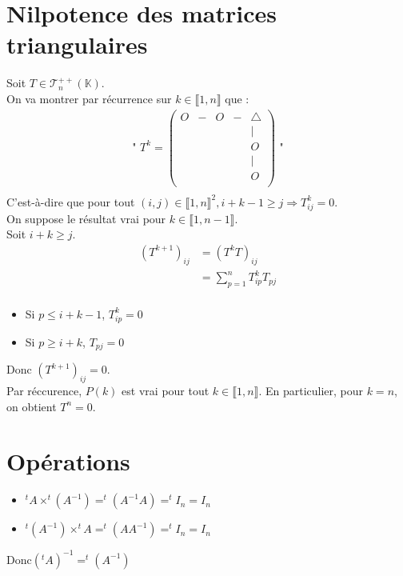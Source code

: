 \documentclass[../main.tex]{subfiles}
\begin{document}
\section{Nilpotence des matrices triangulaires}
Soit $T \in \mathcal{T}_n^{++}(\mathbb{K})$. \\
On va montrer par récurrence sur $k \in \llbracket 1, n \rrbracket$ que :
\begin{align*}
    \text{" } T^k = 
    \begin{pmatrix}
        O & - & O & - & \triangle \\
        & & & & | \\
        & & & & O \\
        & & & & | \\
        & & & & O \\
    \end{pmatrix}
    \text{ "} \\
\end{align*}
C'est-à-dire que pour tout $(i,j) \in \llbracket 1, n \rrbracket^2, i + k - 1 \geq j \Rightarrow T_{ij}^k = 0$. \\
On suppose le résultat vrai pour $k \in \llbracket 1, n-1 \rrbracket$. \\
Soit $i + k \geq j$. 
\begin{align*}
    (T^{k+1})_{ij} &= (T^k T)_{ij} \\
    &= \sum^n_{p=1} T^k_{ip}T_{pj} \\
\end{align*}
\begin{itemize}
    \item Si $p \leq i + k - 1$, $T^k_{ip} = 0$
    \item Si $p \geq i + k$, $T_{pj} = 0$
\end{itemize}
Donc $(T^{k+1})_{ij} = 0$. \\
Par réccurence, $P(k)$ est vrai pour tout $k \in \llbracket 1, n \rrbracket$. En particulier, pour $k = n$, on obtient $T^n = 0$.

\setcounter{section}{43}
\section{Opérations}
\begin{itemize}
    \item $^tA \times ^t(A^{-1}) = ^t(A^{-1}A) = ^tI_n = I_n$
    \item $^t(A^{-1}) \times ^tA = ^t(AA^{-1}) = ^tI_n = I_n$
\end{itemize}
Donc$(^tA)^{-1} = ^t(A^{-1})$
\end{document}
